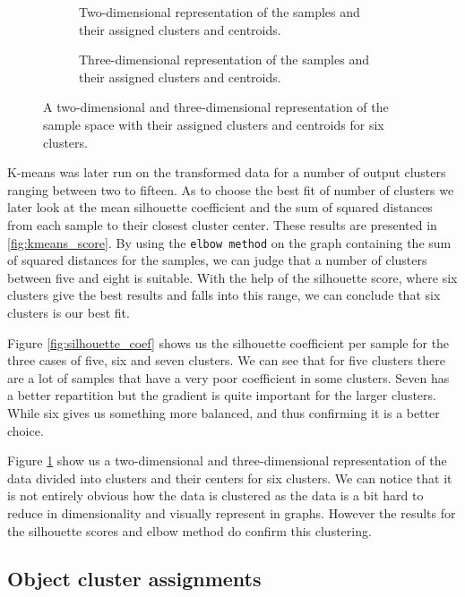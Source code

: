 \begin{figure}
	\begin{subfigure}[b]{\textwidth}
		
		\caption{Two-dimensional representation of the samples and their assigned clusters and centroids.}
	\end{subfigure}
	\begin{subfigure}[b]{\textwidth}
		
		\caption{Three-dimensional representation of the samples and their assigned clusters and centroids.}
	\end{subfigure}
	\caption{A two-dimensional and three-dimensional representation of the sample space with their assigned clusters and centroids for six clusters.}
	\label{fig:clusters}
\end{figure}

K-means was later run on the transformed data for a number of output clusters ranging between two to fifteen. As to choose the best fit of number of clusters we later look at the mean silhouette coefficient and the sum of squared distances from each sample to their closest cluster center. These results are presented in \ref{fig:kmeans_score}. By using the \texttt{elbow method} on the graph containing the sum of squared distances for the samples, we can judge that a number of clusters between five and eight is suitable. With the help of the silhouette score, where six clusters give the best results and falls into this range, we can conclude that six clusters is our best fit.

Figure \ref{fig:silhouette_coef} shows us the silhouette coefficient per sample for the three cases of five, six and seven clusters. We can see that for five clusters there are a lot of samples that have a very poor coefficient in some clusters. Seven has a better repartition but the gradient is quite important for the larger clusters. While six gives us something more balanced, and thus confirming it is a better choice.

Figure \ref{fig:clusters} show us a two-dimensional and three-dimensional representation of the data divided into clusters and their centers for six clusters. We can notice that it is not entirely obvious how the data is clustered as the data is a bit hard to reduce in dimensionality and visually represent in graphs. However the results for the silhouette scores and elbow method do confirm this clustering.


\subsection{Object cluster assignments}

